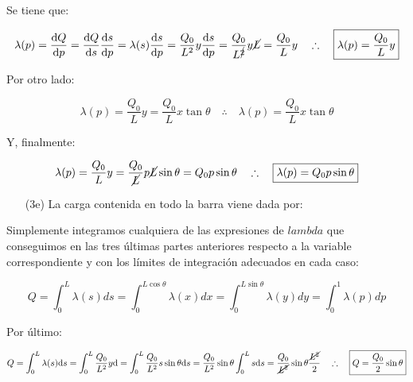\documentclass[a4paper,10pt]{article}
\begin{document}
Se tiene que:

\begin{equation*}
    \lambda(p)=\frac{\mathrm{d}Q}{\mathrm{d}p}=\frac{\mathrm{d}Q}{\mathrm{d}s}\frac{\mathrm{d}s}{\mathrm{d}p}
    =\lambda(s)\frac{\mathrm{d}s}{\mathrm{d}p}
    =\frac{Q_{0}}{L^{2}}y\frac{\mathrm{d}s}{\mathrm{d}p}
    =\frac{Q_{0}}{L^{\cancel{2}}}y\cancel{L}
    =\frac{Q_{0}}{L}y
    \quad\therefore\quad\boxed{\lambda(p)=\frac{Q_{0}}{L}y}
\end{equation*}

Por otro lado:

\begin{equation*}
    \lambda(p)=\frac{Q_{0}}{L}y
    =\frac{Q_{0}}{L}x\tan\theta
    \quad\therefore\quad\boxed{\lambda(p)=\frac{Q_{0}}{L}x\tan\theta}
\end{equation*}

Y, finalmente:

\begin{equation*}
    \lambda(p)=\frac{Q_{0}}{L}y
    =\frac{Q_{0}}{\cancel{L}}p\cancel{L}\sin\theta
    =Q_{0}p\sin\theta
    \quad\therefore\quad\boxed{\lambda(p)=Q_{0}p\sin\theta}
\end{equation*}

\begin{itemize}
    \item[(3e)] La carga contenida en todo la barra viene dada por:
\end{itemize}

Simplemente integramos cualquiera de las expresiones de $lambda$ que
conseguimos en las tres \'ultimas partes anteriores respecto a la
variable correspondiente y con los l\'imites de integraci\'on
adecuados en cada caso:

\begin{equation*}
    Q=\int_{0}^{L}\lambda(s)ds=\int_{0}^{L\cos\theta}\lambda(x)dx
    =\int_{0}^{L\sin\theta}\lambda(y)dy=\int_{0}^{1}\lambda(p)dp
\end{equation*}

Por \'ultimo:

\begin{equation*}
        Q=\int_{0}^{L}\lambda(s)\mathrm{d}s=\int_{0}^{L}\frac{Q_{0}}{L^{2}}y\mathrm{d}
        =\int_{0}^{L}\frac{Q_{0}}{L^{2}}s\sin\theta\mathrm{d}s
        =\frac{Q_{0}}{L^{2}}\sin\theta\int_{0}^{L}s\mathrm{d}s
        =\frac{Q_{0}}{\cancel{L^{2}}}\sin\theta\frac{\cancel{L^{2}}}{2}
    \quad\therefore\quad\boxed{Q=\frac{Q_{0}}{2}\sin\theta}
\end{equation*}
\end{document}
